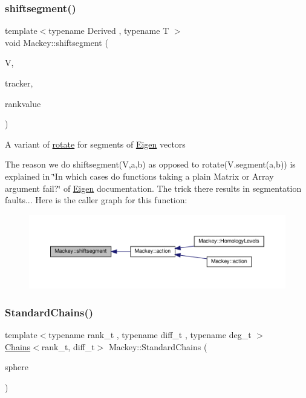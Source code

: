 \subsubsection{\texorpdfstring{shiftsegment()}{shiftsegment()}}
{\footnotesize\ttfamily template$<$typename Derived , typename T $>$ \\
void Mackey\+::shiftsegment (\begin{DoxyParamCaption}\item[{Eigen\+::\+Matrix\+Base$<$ Derived $>$ \&}]{V,  }\item[{int}]{tracker,  }\item[{T}]{rankvalue }\end{DoxyParamCaption})}

A variant of \hyperlink{namespaceMackey_a38a833de54971845cbdb8c96f830725b}{rotate} for segments of \hyperlink{namespaceEigen}{Eigen} vectors

The reason we do shiftsegment(\+V,a,b) as opposed to rotate(V.\+segment(a,b)) is explained in \char`\"{}\+In which cases do functions taking a plain Matrix or Array argument fail?\char`\"{} of \hyperlink{namespaceEigen}{Eigen} documentation. The trick there results in segmentation faults... Here is the caller graph for this function\+:\nopagebreak
\begin{figure}[H]
\begin{center}
\leavevmode
\includegraphics[width=350pt]{namespaceMackey_aab8a6292210a3b71960cb03b79d218e6_icgraph}
\end{center}
\end{figure}
\mbox{\label{namespaceMackey_a425b988266cedec0299fb539d99179b1}} 
\subsubsection{\texorpdfstring{Standard\+Chains()}{StandardChains()}\hspace{0.1cm}{\footnotesize\ttfamily [1/2]}}
{\footnotesize\ttfamily template$<$typename rank\+\_\+t , typename diff\+\_\+t , typename deg\+\_\+t $>$ \\
\hyperlink{classMackey_1_1Chains}{Chains}$<$rank\+\_\+t, diff\+\_\+t$>$ Mackey\+::\+Standard\+Chains (\begin{DoxyParamCaption}\item[{const deg\+\_\+t \&}]{sphere }\end{DoxyParamCaption})}




